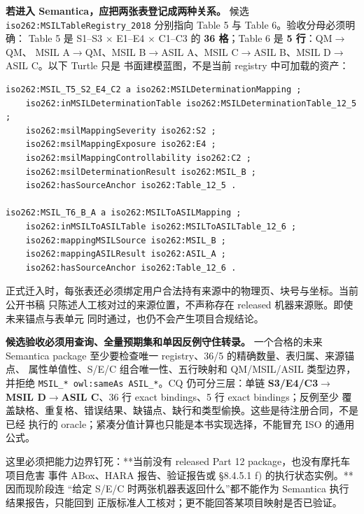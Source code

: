 \textbf{若进入 Semantica，应把两张表登记成两种关系。} 候选
\nolinkurl{iso262:MSILTableRegistry_2018} 分别指向 Table 5 与 Table 6。验收分母必须明确：
Table 5 是 S1–S3 \(\times\) E1–E4 \(\times\) C1–C3 的 \textbf{36 格}；Table 6 是 \textbf{5 行}：QM\(\rightarrow\)QM、
MSIL A\(\rightarrow\)QM、MSIL B\(\rightarrow\)ASIL A、MSIL C\(\rightarrow\)ASIL B、MSIL D\(\rightarrow\)ASIL C。以下 Turtle 只是
书面建模蓝图，不是当前 registry 中可加载的资产：

\nopagebreak[4]
\begin{codebox}
\begin{Verbatim}[fontsize=\small,breaklines=true,breakanywhere=true,breaksymbolleft={},breaksymbolright={}]
iso262:MSIL_T5_S2_E4_C2 a iso262:MSILDeterminationMapping ;
    iso262:inMSILDeterminationTable iso262:MSILDeterminationTable_12_5 ;
    iso262:msilMappingSeverity iso262:S2 ;
    iso262:msilMappingExposure iso262:E4 ;
    iso262:msilMappingControllability iso262:C2 ;
    iso262:msilDeterminationResult iso262:MSIL_B ;
    iso262:hasSourceAnchor iso262:Table_12_5 .

iso262:MSIL_T6_B_A a iso262:MSILToASILMapping ;
    iso262:inMSILToASILTable iso262:MSILToASILTable_12_6 ;
    iso262:mappingMSILSource iso262:MSIL_B ;
    iso262:mappingASILResult iso262:ASIL_A ;
    iso262:hasSourceAnchor iso262:Table_12_6 .
\end{Verbatim}
\end{codebox}

正式迁入时，每张表还必须绑定用户合法持有来源中的物理页、块号与坐标。当前公开书稿
只陈述人工核对过的来源位置，不声称存在 released 机器来源账。即使未来锚点与表单元
同时通过，也仍不会产生项目合规结论。

\textbf{候选验收必须用查询、全量预期集和单因反例守住转录。} 一个合格的未来
Semantica package 至少要检查唯一 registry、36/5 的精确数量、表归属、来源锚点、
属性单值性、S/E/C 组合唯一性、五行映射和 QM/MSIL/ASIL 类型边界，并拒绝
\allowbreak{}\texttt{MSIL\_\allowbreak{}* \allowbreak{}owl:\allowbreak{}same\allowbreak{}As \allowbreak{}ASIL\_\allowbreak{}*}\allowbreak{}。CQ 仍可分三层：单链
\textbf{S3/E4/C3\(\rightarrow\)MSIL D\(\rightarrow\)ASIL C}、36 行 exact bindings、5 行 exact bindings；反例至少
覆盖缺格、重复格、错误结果、缺锚点、缺行和类型偷换。这些是待注册合同，不是已经
执行的 oracle；紧凑分值计算也只能是本书实现选择，不能冒充 ISO 的通用公式。

这里必须把能力边界钉死：**当前没有 released Part 12 package，也没有摩托车项目危害
事件 ABox、HARA 报告、验证报告或 §8.4.5.1 f) 的执行状态实例。** 因而现阶段连
“给定 S/E/C 时两张机器表返回什么”都不能作为 Semantica 执行结果报告，只能回到
正版标准人工核对；更不能回答某项目映射是否已验证。

